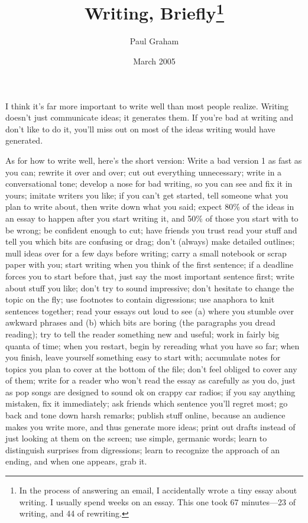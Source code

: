 \documentclass{simple}
\title{Writing, Briefly\footnote{In the process of answering an email, I accidentally wrote a tiny essay about writing. I usually spend weeks on an essay. This one took 67 minutes—23 of writing, and 44 of rewriting.}}
\author{Paul Graham}
\date{March 2005}
\begin{document}
\maketitle

I think it's far more important to write well than most people realize. Writing
doesn't just communicate ideas; it generates them. If you're bad at writing and
don't like to do it, you'll miss out on most of the ideas writing would have
generated.

As for how to write well, here's the short version: Write a bad version 1 as
fast as you can; rewrite it over and over; cut out everything unnecessary;
write in a conversational tone; develop a nose for bad writing, so you can see
and fix it in yours; imitate writers you like; if you can't get started, tell
someone what you plan to write about, then write down what you said; expect
80\% of the ideas in an essay to happen after you start writing it, and 50\% of
those you start with to be wrong; be confident enough to cut; have friends you
trust read your stuff and tell you which bits are confusing or drag; don't
(always) make detailed outlines; mull ideas over for a few days before writing;
carry a small notebook or scrap paper with you; start writing when you think of
the first sentence; if a deadline forces you to start before that, just say the
most important sentence first; write about stuff you like; don't try to sound
impressive; don't hesitate to change the topic on the fly; use footnotes to
contain digressions; use anaphora to knit sentences together; read your essays
out loud to see (a) where you stumble over awkward phrases and (b) which bits
are boring (the paragraphs you dread reading); try to tell the reader something
new and useful; work in fairly big quanta of time; when you restart, begin by
rereading what you have so far; when you finish, leave yourself something easy
to start with; accumulate notes for topics you plan to cover at the bottom of
the file; don't feel obliged to cover any of them; write for a reader who won't
read the essay as carefully as you do, just as pop songs are designed to sound
ok on crappy car radios; if you say anything mistaken, fix it immediately; ask
friends which sentence you'll regret most; go back and tone down harsh remarks;
publish stuff online, because an audience makes you write more, and thus
generate more ideas; print out drafts instead of just looking at them on the
screen; use simple, germanic words; learn to distinguish surprises from
digressions; learn to recognize the approach of an ending, and when one
appears, grab it.
\end{document}
